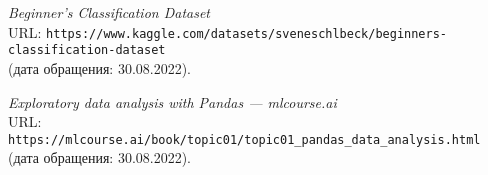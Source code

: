 \begin{thebibliography}{99}
{\itshape Beginner's Classification Dataset}\\
URL: \texttt{https://www.kaggle.com/datasets/sveneschlbeck/beginners-classification-dataset}\\
(дата обращения: 30.08.2022).

{\itshape Exploratory data analysis with Pandas --- mlcourse.ai}\\
URL: \texttt{https://mlcourse.ai/book/topic01/topic01\_pandas\_data\_analysis.html}\\
(дата обращения: 30.08.2022).

\end{thebibliography}
\pagebreak
